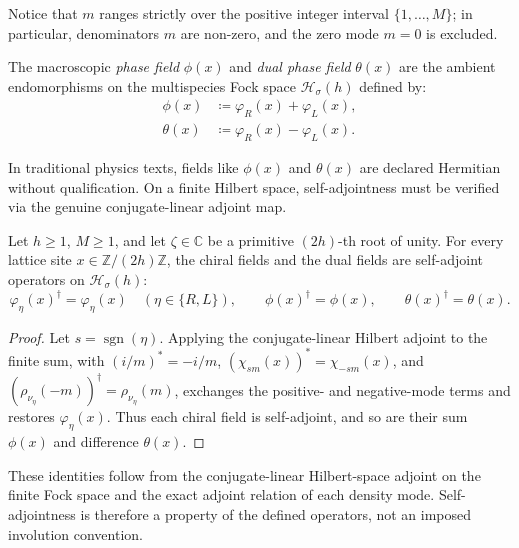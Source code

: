 Notice that $m$ ranges strictly over the positive integer interval $\{1, \dots, M\}$; in particular, denominators $m$ are non-zero, and the zero mode $m = 0$ is excluded.

\begin{definition}
\label{def:dual_fields}
The macroscopic \emph{phase field} $\phi(x)$ and \emph{dual phase field} $\theta(x)$ are the ambient endomorphisms on the multispecies Fock space $\mathcal{H}_\sigma(h)$ defined by:
\begin{align}
\phi(x) &\coloneqq \varphi_R(x) + \varphi_L(x), \\
\theta(x) &\coloneqq \varphi_R(x) - \varphi_L(x).
\end{align}
\end{definition}

In traditional physics texts, fields like $\phi(x)$ and $\theta(x)$ are declared Hermitian without qualification. On a finite Hilbert space, self-adjointness must be verified via the genuine conjugate-linear adjoint map.

\begin{lemma}
\label{lem:dual_fields_hermitian}
Let $h \ge 1$, $M \ge 1$, and let $\zeta \in \mathbb{C}$ be a primitive $(2h)$-th root of unity. For every lattice site $x \in \mathbb{Z}/(2h)\mathbb{Z}$, the chiral fields and the dual fields are self-adjoint operators on $\mathcal{H}_\sigma(h)$:
\begin{equation}
\varphi_\eta(x)^\dagger = \varphi_\eta(x) \quad (\eta \in \{R, L\}), \qquad \phi(x)^\dagger = \phi(x), \qquad \theta(x)^\dagger = \theta(x).
\end{equation}
\end{lemma}

\begin{proof}
Let $s=\operatorname{sgn}(\eta)$. Applying the conjugate-linear Hilbert adjoint to the finite sum, with $(i/m)^*=-i/m$, $(\chi_{sm}(x))^*=\chi_{-sm}(x)$, and $(\rho_{\nu_\eta}(-m))^\dagger=\rho_{\nu_\eta}(m)$, exchanges the positive- and negative-mode terms and restores $\varphi_\eta(x)$. Thus each chiral field is self-adjoint, and so are their sum $\phi(x)$ and difference $\theta(x)$.
\end{proof}

\begin{remark}
These identities follow from the conjugate-linear Hilbert-space adjoint on the finite Fock space and the exact adjoint relation of each density mode. Self-adjointness is therefore a property of the defined operators, not an imposed involution convention.
\end{remark}

